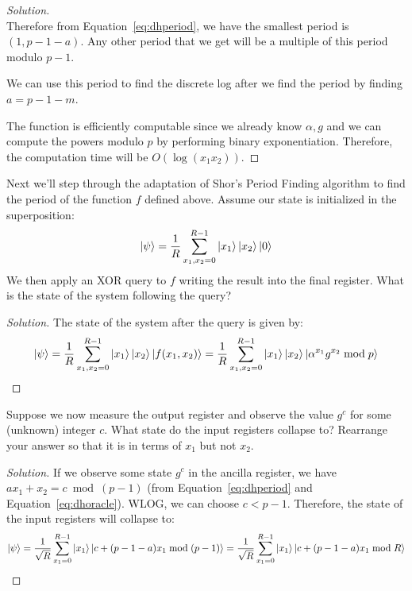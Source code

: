 \begin{solution}[label=ques:4a]
\begin{proof}[Solution]
\begin{equation}
      \label{eq:dhperiod}
    \end{equation}
    Therefore from Equation~\ref{eq:dhperiod}, we have the smallest period is $(1, p - 1 - a)$. Any other period that we get will be a multiple of this period modulo $p - 1$.\par
    We can use this period to find the discrete log after we find the period by finding $a = p - 1 - m$.\par
    The function is efficiently computable since we already know $\alpha, g$ and we can compute the powers modulo $p$ by performing binary exponentiation. Therefore, the computation time will be $O(\log(x_1x_2))$.
  \end{proof}
\end{solution}

\begin{solution}[label=ques:4b]
  \begin{question}
    Next we'll step through the adaptation of Shor's Period Finding algorithm to find the period of the function $f$ defined above. Assume our state is initialized in the superposition:
\[
\ket{\psi} = \frac{1}{R}\sum_{x_1,x_2 =0}^{R-1}  \ket{x_1}\ket{x_2}\ket{0}
\]
We then apply an XOR query to $f$ writing the result into the final register. What is the state of the system following the query?
  \end{question}
  \tcblower{}
  \begin{proof}[Solution]
    The state of the system after the query is given by:
    \begin{equation}
      \ket{\psi} = \frac{1}{R}\sum_{x_1,x_2 =0}^{R-1}  \ket{x_1}\ket{x_2}\ket{f(x_1, x_2)} = \frac{1}{R}\sum_{x_1,x_2 =0}^{R-1}  \ket{x_1}\ket{x_2}\ket{\alpha^{x_1}g^{x_2} \bmod p}
      \label{eq:dhoracle}
    \end{equation}
  \end{proof}
\end{solution}

\begin{solution}[label=ques:4c]
  \begin{question}
    Suppose we now measure the output register and observe the value $g^c$ for some (unknown) integer $c$. What state do the input registers collapse to? Rearrange your answer so that it is in terms of $x_1$ but not $x_2$.
  \end{question}
  \tcblower{}
  \begin{proof}[Solution]
    If we observe some state $g^c$ in the ancilla register, we have $a x_1 + x_2 = c \bmod (p - 1)$ (from Equation~\ref{eq:dhperiod} and Equation~\ref{eq:dhoracle}). WLOG, we can choose $c < p - 1$. Therefore, the state of the input registers will collapse to:
    \begin{equation}
      \ket{\psi} = \frac{1}{\sqrt{R}}\sum_{x_1 =0}^{R-1}  \ket{x_1}\ket{c + (p - 1 - a)x_1 \bmod (p - 1)} = \frac{1}{\sqrt{R}}\sum_{x_1 =0}^{R-1}  \ket{x_1}\ket{c + (p - 1 - a)x_1 \bmod R}
      \label{eq:dhcollapse}
    \end{equation}
  \end{proof}
\end{solution}

